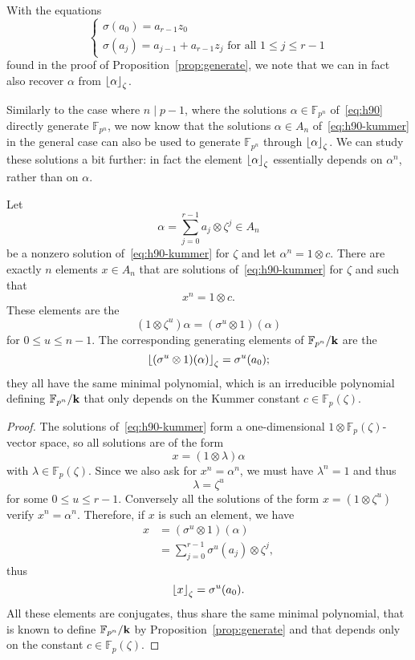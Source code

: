  \begin{rem}
   \label{rem:recover-alpha}
 With the equations 
    \[
   \left\{ 
     \begin{array}{l}
       \sigma(a_0) = a_{r-1}z_0 \\
       \sigma(a_j) = a_{j-1}+a_{r-1}z_j\text{ for all }1\leq j\leq r-1
     \end{array}
   \right.
 \]
 found in the proof of Proposition~\ref{prop:generate}, we note that we can in
 fact also recover $\alpha$ from $\left\lfloor \alpha \right\rfloor_{\zeta}$.
 \end{rem}
Similarly to the case where $n\mid p-1$, where the solutions
$\alpha\in\mathbb{F}_{p^n}$ of~\eqref{eq:h90} directly generate $\mathbb{F}_{p^n}$, we now know
that the solutions $\alpha\in A_n$ of~\eqref{eq:h90-kummer} in the general case
can also be used to generate $\mathbb{F}_{p^n}$ through $\left\lfloor \alpha \right\rfloor_{\zeta}$.
We can study these solutions a bit further: in fact the element
$\left\lfloor \alpha \right\rfloor_{\zeta}$ essentially depends on $\alpha^n$, rather than on
$\alpha$.
\begin{prop}
  \label{prop:kummer-constant}
  Let
  \[
    \alpha=\sum_{j=0}^{r-1}a_j\otimes\zeta^j\in A_n
  \]
  be a nonzero solution of~\eqref{eq:h90-kummer} for $\zeta$ and
  let $\alpha^n = 1\otimes c$. There are exactly $n$ elements $x\in A_n$ that
  are solutions of~\eqref{eq:h90-kummer} for $\zeta$ and such that
  \[
    x^n = 1\otimes c.
  \]
  These elements are the
  \[
    (1\otimes\zeta^u)\alpha = (\sigma^u\otimes1)(\alpha)
  \]
  for $0\leq u\leq n-1$. The corresponding generating elements of
  $\mathbb{F}_{p^n}/\mathbf{k}$ are the
  \[
    \left\lfloor (\sigma^u\otimes1)(\alpha) \right\rfloor_{\zeta} = \sigma^u(a_0);
  \]
  they all have the same minimal polynomial, which is an irreducible polynomial
  defining $\mathbb{F}_{p^n}/\mathbf{k}$ that only depends on the Kummer constant
  $c\in\mathbb{F}_{p}(\zeta)$.
\end{prop}
\begin{proof}
  The solutions of~\eqref{eq:h90-kummer} form a one-dimensional
  $1\otimes\mathbb{F}_p(\zeta)$-vector space, so all solutions are of the form
  \[
    x = (1\otimes\lambda)\alpha
  \]
  with $\lambda\in\mathbb{F}_p(\zeta)$.
  Since we also ask for $x^n = \alpha^n$, we must have $\lambda^n = 1$ and thus 
  \[
    \lambda = \zeta^u
  \]
  for some $0\leq u\leq r-1$. Conversely all the solutions of the form
  $x=(1\otimes\zeta^u)$ verify $x^n=\alpha^n$. Therefore, if $x$ is such an
  element, we have
  \begin{align*}
    x &= (\sigma^u\otimes1)(\alpha)\\
    &= \sum_{j=0}^{r-1}\sigma^u(a_j)\otimes\zeta^j,
  \end{align*}
  thus
  \[
    \left\lfloor x \right\rfloor_{\zeta} = \sigma^u(a_0).
  \]
  All these elements are conjugates, thus share the same minimal polynomial,
  that is known to define $\mathbb{F}_{p^n}/\mathbf{k}$ by
  Proposition~\ref{prop:generate} and that depends only on the constant
  $c\in\mathbb{F}_p(\zeta)$.
\end{proof}

